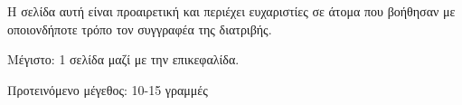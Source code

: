 \chapter*{\cseeuxaristies}
\thispagestyle{empty}

Η σελίδα αυτή είναι προαιρετική και περιέχει ευχαριστίες σε άτομα
που βοήθησαν με οποιονδήποτε τρόπο τον συγγραφέα της διατριβής.

\y\noindent Μέγιστο: 1 σελίδα μαζί με την επικεφαλίδα.

\y\noindent Προτεινόμενο μέγεθος: 10-15 γραμμές
